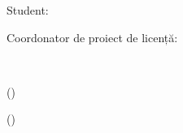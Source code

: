 \begin{titlepage}
    \bigskip
    \bigskip
    
    \begin{minipage}{0.35\textwidth}
        \raggedleft
        {Student: \par}
        \bigskip
        {Coordonator de proiect de licență: \par}
    \end{minipage}
    ~
    \begin{minipage}{0.35\textwidth}
        \raggedright
        {\emph{\authorname} (\dotfill) \par}
        \bigskip
        {\emph{\supername} (\dotfill) \par}
    \end{minipage}

\end{titlepage}
